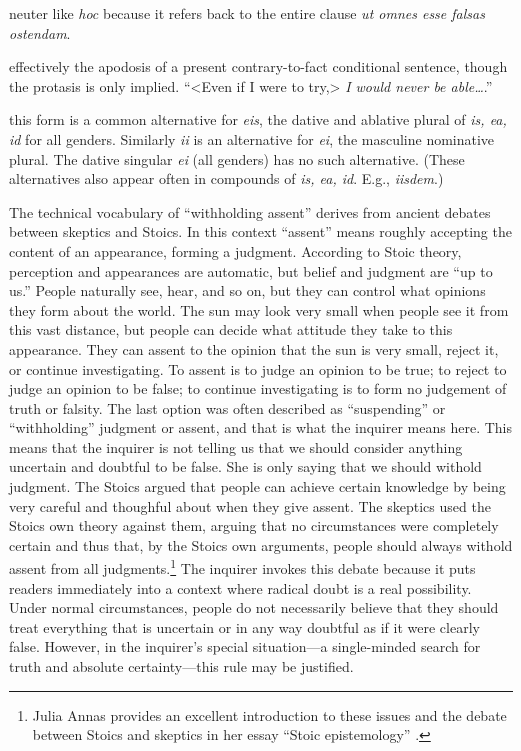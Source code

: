  neuter like \textit{hoc} because it refers back to the entire clause \textit{ut omnes esse falsas ostendam}.

 effectively the apodosis of a present contrary-to-fact conditional sentence, though the protasis is only implied. ``<Even if I were to try,> \textit{I would never be able\dots}.''

 this form is a common alternative for \textit{eis}, the dative and ablative plural of \textit{is, ea, id} for all genders. Similarly \textit{ii} is an alternative for \textit{ei}, the masculine nominative plural. The dative singular \textit{ei} (all genders) has no such alternative. (These alternatives also appear often in compounds of \textit{is, ea, id}. E.g., \textit{iisdem}.)

 The technical vocabulary of ``withholding assent'' derives from ancient debates between skeptics and Stoics. In this context ``assent'' means roughly accepting the content of an appearance, forming a judgment. According to Stoic theory, perception and appearances are automatic, but belief and judgment are ``up to us.'' People naturally see, hear, and so on, but they can control what opinions they form about the world. The sun may look very small when people see it from this vast distance, but people can decide what attitude they take to this appearance. They can assent to the opinion that the sun is very small, reject it, or continue investigating. To assent is to judge an opinion to be true; to reject to judge an opinion to be false; to continue investigating is to form no judgement of truth or falsity. The last option was often described as ``suspending'' or ``withholding'' judgment or assent, and that is what the inquirer means here. This means that the inquirer is not telling us that we should consider anything uncertain and doubtful to be false. She is only saying that we should withold judgment. The Stoics argued that people can achieve certain knowledge by being very careful and thoughful about when they give assent. The skeptics used the Stoics own theory against them, arguing that no circumstances were completely certain and thus that, by the Stoics own arguments, people should always withold assent from all judgments.\footnote{Julia Annas provides an excellent introduction to these issues and the debate between Stoics and skeptics in her essay ``Stoic epistemology'' \parencite{annas1990}.} The inquirer invokes this debate because it puts readers immediately into a context where radical doubt is a real possibility. Under normal circumstances, people do not necessarily believe that they should treat everything that is uncertain or in any way doubtful as if it were clearly false. However, in the inquirer's special situation---a single-minded search for truth and absolute certainty---this rule may be justified.


